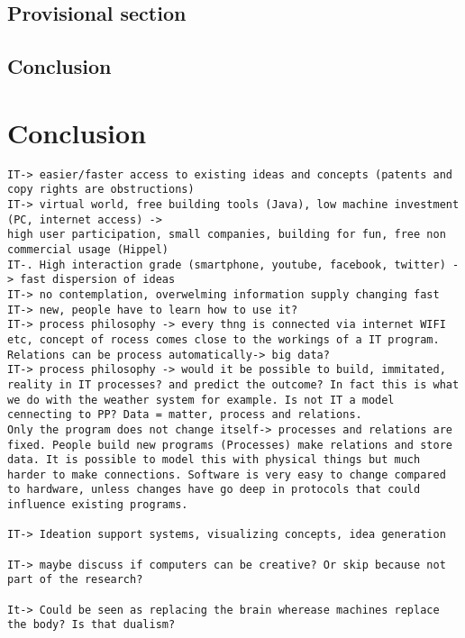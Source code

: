 \documentclass[a4paper]{Thesis}
\begin{document}
\section{Provisional section}

\section{Conclusion}

\chapter{Conclusion}

\begin{verbatim}
IT-> easier/faster access to existing ideas and concepts (patents and copy rights are obstructions)
IT-> virtual world, free building tools (Java), low machine investment (PC, internet access) -> 
high user participation, small companies, building for fun, free non commercial usage (Hippel)
IT-. High interaction grade (smartphone, youtube, facebook, twitter) -> fast dispersion of ideas
IT-> no contemplation, overwelming information supply changing fast
IT-> new, people have to learn how to use it?
IT-> process philosophy -> every thng is connected via internet WIFI etc, concept of rocess comes close to the workings of a IT program. Relations can be process automatically-> big data?
IT-> process philosophy -> would it be possible to build, immitated, reality in IT processes? and predict the outcome? In fact this is what we do with the weather system for example. Is not IT a model cennecting to PP? Data = matter, process and relations.
Only the program does not change itself-> processes and relations are fixed. People build new programs (Processes) make relations and store data. It is possible to model this with physical things but much harder to make connections. Software is very easy to change compared to hardware, unless changes have go deep in protocols that could influence existing programs.

IT-> Ideation support systems, visualizing concepts, idea generation

IT-> maybe discuss if computers can be creative? Or skip because not part of the research?

It-> Could be seen as replacing the brain wherease machines replace the body? Is that dualism?
\end{verbatim}
\end{document}
